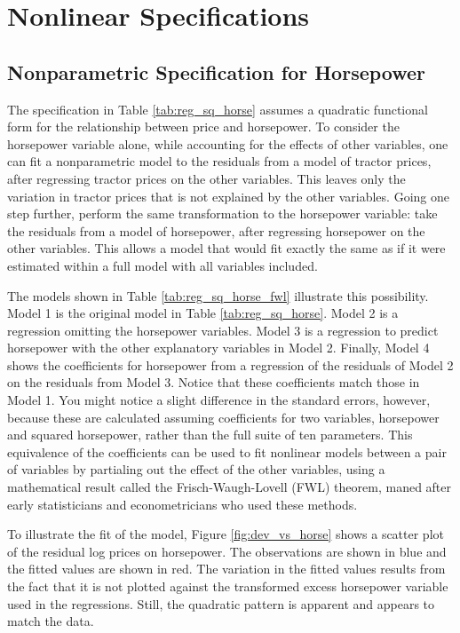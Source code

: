 \documentclass[11pt]{paper}
\begin{document}
\clearpage
\section{Nonlinear Specifications}


\subsection{Nonparametric Specification for Horsepower}


The specification in 
Table \ref{tab:reg_sq_horse}
assumes a quadratic functional form for
the relationship between price and horsepower. 
To consider the horsepower variable alone, 
while accounting for the effects of other variables, 
one can fit a nonparametric model to the residuals 
from a model of tractor prices, 
after regressing tractor prices on the other variables. 
This leaves only the variation in tractor prices that is not explained by the other variables. 
Going one step further, perform the same transformation to the horsepower variable:
take the residuals from a model of horsepower, 
after regressing horsepower on the other variables. 
This allows a model that would fit exactly the same as if it were estimated within a full model with all variables included. 

The models shown in
Table \ref{tab:reg_sq_horse_fwl}
illustrate this possibility. 
Model 1 is the original model in 
Table \ref{tab:reg_sq_horse}. 
Model 2 is a regression omitting the horsepower variables. 
Model 3 is a regression to predict horsepower with the other explanatory variables in Model 2.
Finally, Model 4 shows the coefficients for horsepower
from a regression of the residuals of Model 2
on the residuals from Model 3. 
Notice that these coefficients match those in Model 1. 
You might notice a slight difference in the standard errors, however, 
because these are calculated assuming coefficients 
for two variables, horsepower and squared horsepower,
rather than the full suite of ten parameters.
This equivalence of the coefficients can be used to fit
nonlinear models between a pair of variables by 
partialing out the effect of the other variables, 
using a mathematical result called the Frisch-Waugh-Lovell (FWL) theorem, 
maned after early statisticians and econometricians who used these methods. 



\pagebreak 
To illustrate the fit of the model, 
Figure \ref{fig:dev_vs_horse} shows a scatter plot 
of the residual log prices on horsepower. 
The observations are shown in blue
and the fitted values are shown in red.
The variation in the fitted values results from the 
fact that it is not plotted against the transformed excess horsepower variable used in the regressions.
Still, the quadratic pattern is apparent
and appears to match the data. 
\end{document}
